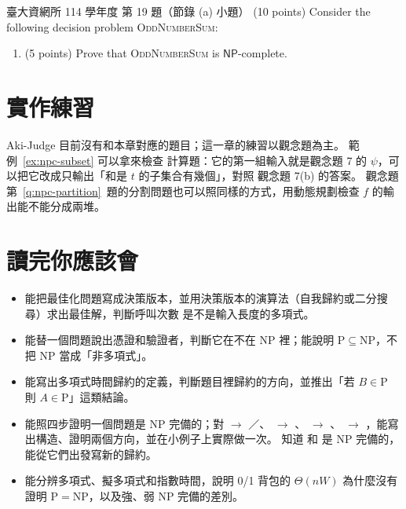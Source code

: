 \begin{pastexam}[label={px:npc-5}]{臺大資網所 114 學年度 第 19 題（節錄 (a) 小題）}
(10 points) Consider the following decision problem \textsc{OddNumberSum}:
\begin{center}
\end{center}
\begin{enumerate}[label=(\alph*)]
\item (5 points) Prove that \textsc{OddNumberSum} is $\mathsf{NP}$-complete.
\end{enumerate}
\end{pastexam}

\section{實作練習}
\label{sec:npc-practice}

Aki-Judge 目前沒有和本章對應的題目；這一章的練習以觀念題為主。 範例~\ref{ex:npc-subset} 可以拿來檢查
計算題：它的第一組輸入就是觀念題 7 的 $\psi$，可以把它改成只輸出「和是 $t$ 的子集合有幾個」，對照
觀念題 7(b) 的答案。 觀念題第~\ref{q:npc-partition}~題的分割問題也可以照同樣的方式，用動態規劃檢查
$f$ 的輸出能不能分成兩堆。

\section{讀完你應該會}
\label{sec:npc-checklist}

\begin{itemize}
\item 能把最佳化問題寫成決策版本，並用決策版本的演算法（自我歸約或二分搜尋）求出最佳解，判斷呼叫次數
是不是輸入長度的多項式。
\item 能替一個問題說出憑證和驗證者，判斷它在不在 NP 裡；能說明 $\mathrm{P} \subseteq \mathrm{NP}$，不把
NP 當成「非多項式」。
\item 能寫出多項式時間歸約的定義，判斷題目裡歸約的方向，並推出「若 $B \in \mathrm{P}$ 則 $A \in
\mathrm{P}$」這類結論。
\item 能照四步證明一個問題是 NP 完備的；對  $\to$ ／、
 $\to$ 、 $\to$ 、 $\to$
，能寫出構造、證明兩個方向，並在小例子上實際做一次。 知道  和  是 NP
完備的，能從它們出發寫新的歸約。
\item 能分辨多項式、擬多項式和指數時間，說明 0/1 背包的 $\Theta(nW)$ 為什麼沒有證明 $\mathrm{P} =
\mathrm{NP}$，以及強、弱 NP 完備的差別。
\end{itemize}

